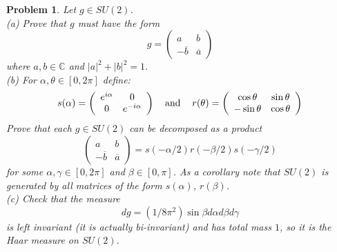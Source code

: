 \documentclass{article}
\newtheorem{problem}{Problem}
\begin{document}
\begin{problem}
Let $g \in SU(2)$.\\
(a) Prove that $g$ must have the form
\[
g = \left ( \begin{array}{cc} a & b\\ -\overline{b} & \overline{a} \end{array} \right )
\]
where $a,b \in \mathbb{C}$ and $|a|^2 + |b|^2 = 1$.\\
(b) For $\alpha, \theta \in [0, 2 \pi]$ define:
\[
\begin{tabular}{ccc}
$\displaystyle{
s(\alpha) = \left ( \begin{array}{cc} e^{i \alpha} & 0\\ 0 & e^{-i\alpha} \end{array} \right )}$
& and
& $\displaystyle{
r(\theta) = \left ( \begin{array}{cc} \cos \theta & \sin \theta \\ -\sin \theta & \cos \theta \end{array} \right )}$
\end{tabular}
\]
Prove that each $g \in SU(2)$ can be decomposed as a product
\[
\left (
\begin{array}{cc}
a & b\\
-\overline{b} & \overline{a}
\end{array}
\right )
=
s(-\alpha/2)r(-\beta/2)s(-\gamma/2)
\]
for some $\alpha, \gamma \in [0,2 \pi]$ and $\beta \in [0,\pi]$. As a corollary note that $SU(2)$ is generated by all matrices of the form $s(\alpha)$, $r(\beta)$.\\
(c) Check that the measure
\[
dg = (1/8\pi^2) \sin \beta d \alpha d \beta d \gamma
\]
is left invariant (it is actually bi-invariant) and has total mass $1$, so it is the Haar measure on $SU(2)$.
\end{problem}
\end{document}
